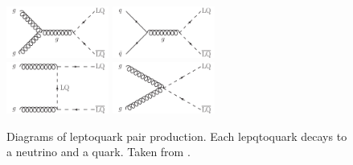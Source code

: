   \begin{figure}[h!]
    \centering
    \includegraphics[width=0.3\textwidth]{figures/MT2_2019/Figure_009-a}
    \includegraphics[width=0.3\textwidth]{figures/MT2_2019/Figure_009-b}\\
    \vspace{3mm}
    \includegraphics[width=0.3\textwidth]{figures/MT2_2019/Figure_009-c}
    \includegraphics[width=0.3\textwidth]{figures/MT2_2019/Figure_009-d}
    \vspace{3mm}
    \caption[Leptoquark pair production diagrams.]{Diagrams of leptoquark pair production. Each lepqtoquark decays to a neutrino and a quark. Taken from \cite{MT2_2019}.}
    \label{fig:LQdiags}
  \end{figure}  

